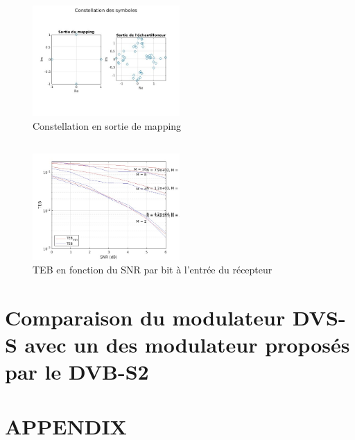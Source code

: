 \documentclass[a4paper, 12pt]{article}
\begin{document}
\subsection{}
\begin{figure}[H]
    \centering
    \includegraphics[width=0.5\textwidth]{graphics/2-4.jpg}
    \caption{Constellation en sortie de mapping}
    \label{fig:mon_etiquette}
\end{figure}


\subsection{}
\begin{figure}[H]
    \centering
    \includegraphics[width=0.5\textwidth]{graphics/2-5.jpg}
    \caption{TEB en fonction du SNR par bit à l'entrée du récepteur}
    \label{fig:mon_etiquette}
\end{figure}

\subsection{}

\clearpage
\section{Comparaison du modulateur DVS-S avec un des modulateur proposés par le DVB-S2}



\clearpage
\appendix
\section{APPENDIX}
\end{document}
